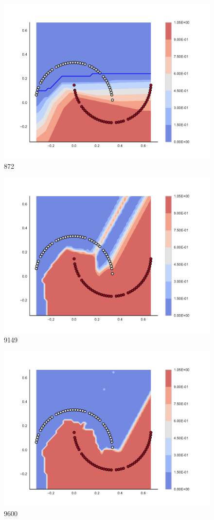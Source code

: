\begin{subfigure}[b]{0.09\textwidth}
    \includegraphics[clip, trim=2.35cm 1.75cm 4.5cm 0cm,width=\textwidth]{img/convergence/872.pdf}
    \caption{872}
    \label{fig:convergence_872}
\end{subfigure}
%
\begin{subfigure}[b]{0.09\textwidth}
    \includegraphics[clip, trim=2.35cm 1.75cm 4.5cm 0cm,width=\textwidth]{img/convergence/9149.pdf}
    \caption{9149}
    \label{fig:convergence_9149}
\end{subfigure}
%
\begin{subfigure}[b]{0.09\textwidth}
    \includegraphics[clip, trim=2.35cm 1.75cm 4.5cm 0cm,width=\textwidth]{img/convergence/9600.pdf}
    \caption{9600}
    \label{fig:convergence_9600}
\end{subfigure}
%